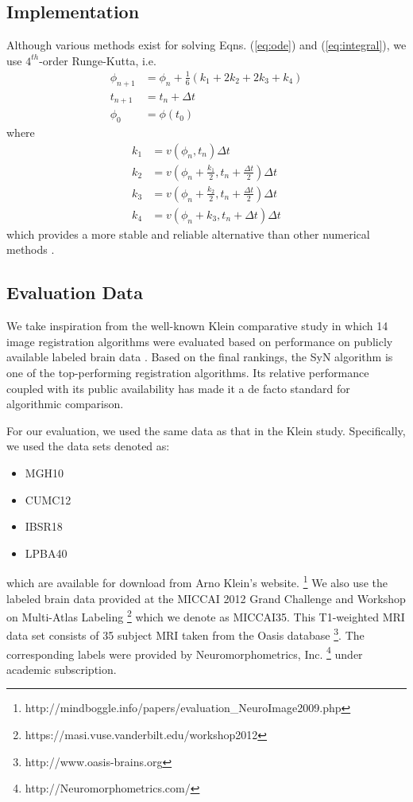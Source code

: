 \documentclass{frontiersSCNS}
\begin{document}
\subsection{Implementation}

Although various methods exist for solving Eqns. (\ref{eq:ode}) and (\ref{eq:integral}),
we use $4^{th}$-order Runge-Kutta, i.e.
\begin{align}
  \phi_{n+1} &= \phi_{n} + \frac{1}{6}\left( k_1 + 2k_2 + 2k_3 + k_4 \right) \\
  t_{n+1} &= t_{n} + \Delta t \\
  \phi_0 &= \phi(t_0)
\end{align}
where
\begin{align}
  k_1 &= v\left( \phi_{n}, t_{n} \right)\Delta t \\
  k_2 &= v\left( \phi_{n} + \frac{k_1}{2}, t_{n} + \frac{\Delta t}{2} \right)\Delta t \\
  k_3 &= v\left( \phi_{n} + \frac{k_2}{2}, t_{n} + \frac{\Delta t}{2} \right)\Delta t \\
  k_4 &= v\left( \phi_{n} + k_3, t_{n} + \Delta t \right)\Delta t
\end{align}
which provides a more stable and reliable alternative than other numerical
methods \citep{press2007}.

\subsection{Evaluation Data}

We take inspiration from the well-known
Klein comparative study in which 14 image registration
algorithms were evaluated based on performance
on publicly available labeled brain data \citep{klein2009}.
Based on the final rankings, the SyN algorithm is one
of the top-performing registration algorithms.  Its relative
performance coupled with its public availability has made
it a de facto standard for algorithmic comparison.

For our evaluation, we used the same data as that in the
Klein study.  Specifically, we used the data sets denoted as:
\begin{itemize}
  \item MGH10
  \item CUMC12
  \item IBSR18
  \item LPBA40
\end{itemize}
which are available for download from Arno Klein's website.%
\footnote{
http://mindboggle.info/papers/evaluation\_NeuroImage2009.php
}
We also use the labeled brain data provided at the
MICCAI 2012 Grand Challenge and Workshop on Multi-Atlas
Labeling%
\footnote{
https://masi.vuse.vanderbilt.edu/workshop2012
} which we denote as MICCAI35.  This T1-weighted
MRI data set consists of 35 subject MRI taken from the
Oasis database%
\footnote{
http://www.oasis-brains.org
}.  The corresponding labels were provided by Neuromorphometrics,
Inc.%
\footnote{
http://Neuromorphometrics.com/
}
under academic subscription.
\end{document}
